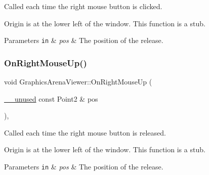 Called each time the right mouse button is clicked. 

Origin is at the lower left of the window. This function is a stub.


\begin{DoxyParams}[1]{Parameters}
\mbox{\tt in}  & {\em pos} & The position of the release. \\
\hline
\end{DoxyParams}
\mbox{\label{class_graphics_arena_viewer_a5dfa16dca83575e253b6d3ea344f8746}} 
\subsubsection{\texorpdfstring{On\+Right\+Mouse\+Up()}{OnRightMouseUp()}}
{\footnotesize\ttfamily void Graphics\+Arena\+Viewer\+::\+On\+Right\+Mouse\+Up (\begin{DoxyParamCaption}\item[{\mbox{\hyperlink{common_8h_a2e3484535ee610c8e19e9859563abe48}{\+\_\+\+\_\+unused}} const Point2 \&}]{pos }\end{DoxyParamCaption})\hspace{0.3cm}{\ttfamily [inline]}, {\ttfamily [override]}}



Called each time the right mouse button is released. 

Origin is at the lower left of the window. This function is a stub.


\begin{DoxyParams}[1]{Parameters}
\mbox{\tt in}  & {\em pos} & The position of the release. \\
\hline
\end{DoxyParams}
\mbox{\label{class_graphics_arena_viewer_a086e2e29e1a5745a8ee4f12996897b22}} 
